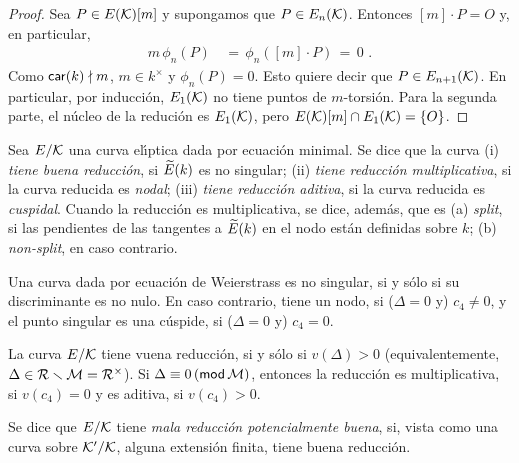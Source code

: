 \begin{proof}
	Sea $P\in E(\cal{K})[m]$ y supongamos que $P\in E_{n}(\cal{K})$.
	Entonces $[m]\cdot P=O$ y, en particular,
	\begin{align*}
		m\,\phi_{n}(P) & \,=\,\phi_{n}([m]\cdot P)\,=\,0
		\text{ .}
	\end{align*}
	Como $\char k\nmid m$, $m\in k^{\times}$ y $\phi_{n}(P)=0$. Esto quiere
	decir que $P\in E_{n+1}(\cal{K})$. En particular, por inducci\'{o}n,
	$E_{1}(\cal{K})$ no tiene puntos de $m$-torsi\'{o}n. Para la segunda
	parte, el n\'{u}cleo de la reduci\'{o}n es $E_{1}(\cal{K})$, pero
	$E(\cal{K})[m]\cap E_{1}(\cal{K})=\{O\}$.
\end{proof}

\begin{defReduccion}\label{def:reduccion}
	Sea $E/\cal{K}$ una curva el\'{\i}ptica dada por ecuaci\'{o}n minimal.
	Se dice que la curva (i) \emph{tiene buena reducci\'{o}n}, si
	$\reducido E(k)$ es no singular; (ii) \emph{tiene reducci\'{o}n %
	multiplicativa}, si la curva reducida es \emph{nodal}; (iii)
	\emph{tiene reducci\'{o}n aditiva}, si la curva reducida es
	\emph{cuspidal}. Cuando la reducci\'{o}n es multiplicativa, se dice,
	adem\'{a}s, que es (a) \emph{split}, si las pendientes de las
	tangentes a $\reducido E(k)$ en el nodo est\'{a}n definidas sobre $k$;
	(b) \emph{non-split}, en caso contrario.
\end{defReduccion}

\begin{obsReduccion}\label{obs:reduccion}
	Una curva dada por ecuaci\'{o}n de Weierstrass es no singular, si y
	s\'{o}lo si su discriminante es no nulo. En caso contrario, tiene un
	nodo, si ($\Delta=0$ y) $c_{4}\not=0$, y el punto singular es una
	c\'{u}spide, si ($\Delta=0$ y) $c_{4}=0$.

	La curva $E/\cal{K}$ tiene vuena reducci\'{o}n, si y s\'{o}lo si
	$v(\Delta)>0$ (equivalentemente,
	$\Delta\in\cal{R}\setmin\cal{M}=\cal{R}^{\times}$).
	Si $\Delta\equiv 0\,(\modulo\,\cal{M})$, entonces la reducci\'{o}n es
	multiplicativa, si $v(c_{4})=0$ y es aditiva, si $v(c_{4})>0$.
\end{obsReduccion}

\begin{defReduccion}\label{def:reduccionpotencialmentebuena}
	Se dice que $E/\cal{K}$ tiene \emph{mala reducci\'{o}n potencialmente %
	buena}, si, vista como una curva sobre $\cal{K}'/\cal{K}$, alguna
	extensi\'{o}n finita, tiene buena reducci\'{o}n.
\end{defReduccion}

